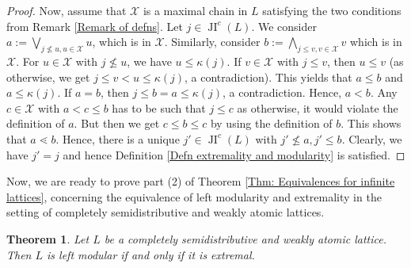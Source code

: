 \documentclass{amsart}
\theoremstyle{thmstyle}
\newtheorem{theorem}[thm]{Theorem}
\theoremstyle{exstyle}
\theoremstyle{defstyle}
\theoremstyle{remstyle}
\theoremstyle{remstyle}
\DeclareMathOperator*{\JI}{JI}
\begin{document}
\begin{proof}
    Now, assume that $\mathcal{X}$ is a maximal chain in $L$ satisfying the two conditions from Remark \ref{Remark of defns}. Let $j \in \JI^c(L)$.
    We consider $a:= \bigvee_{j \not\le u, u\in \mathcal{X}}u$, which is in $\mathcal{X}$. Similarly, consider $b:= \bigwedge_{j \le v, v \in \mathcal{X}}v$ which is in $\mathcal{X}$. For $u \in \mathcal{X}$ with $j \not\le u$, we have $u \le \kappa(j)$. If $v \in \mathcal{X}$ with $j \le v$, then $u \le v$ (as otherwise, we get $j \le v < u \le \kappa(j)$, a contradiction). This yields that $a \le b$ and $a \le \kappa(j)$.  If $a = b$, then $j \le b=a \le \kappa(j)$, a contradiction. Hence, $a < b$. Any $c \in \mathcal{X}$ with $a < c \le b$ has to be such that $j \le c$ as otherwise, it would violate the definition of $a$. But then we get $c \le b \le c$ by using the definition of $b$. This shows that $a \lessdot b$. Hence, there is a unique $j' \in \JI^c(L)$ with $j' \not\le a, j' \le b$. Clearly, we have $j' = j$ and hence Definition \ref{Defn extremality and modularity} is satisfied.
\end{proof}

Now, we are ready to prove part (2) of Theorem \ref{Thm: Equivalences for infinite lattices}, concerning the equivalence of left modularity and extremality in the setting of completely semidistributive and weakly atomic lattices.

\begin{theorem}\label{Thm: Equiv left modular & Extremal for weakly atomic completely semidistributive lattices}
    Let $L$ be a completely semidistributive and weakly atomic lattice. Then $L$ is left modular if and only if it is extremal.
\end{theorem}
\end{document}
